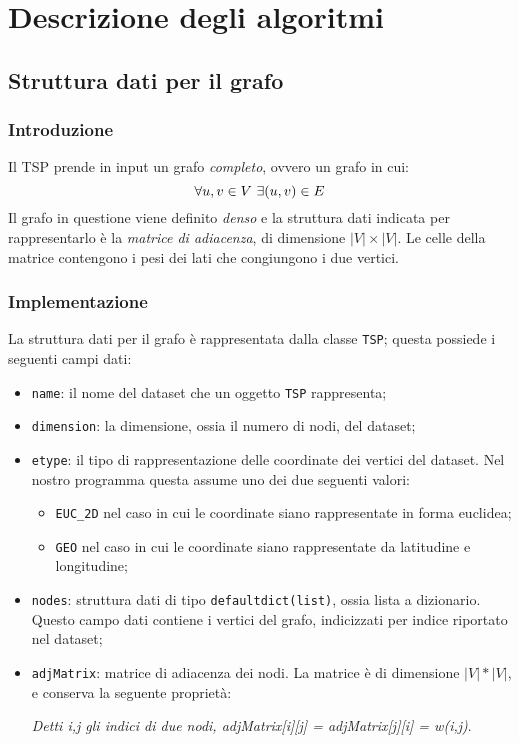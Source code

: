 \section{Descrizione degli algoritmi}

\subsection{Struttura dati per il grafo}

\subsubsection{Introduzione}

Il TSP prende in input un grafo \textit{completo}, ovvero un grafo in cui:
\[
    \forall u, v \in V \textnormal{ } \exists (u, v) \in E
\]
Il grafo in questione viene definito \textit{denso} e la struttura dati indicata per rappresentarlo è
la \textit{matrice di adiacenza}, di dimensione $|V| \times |V|$. Le celle della matrice contengono
i pesi dei lati che congiungono i due vertici.

\subsubsection{Implementazione}

La struttura dati per il grafo è rappresentata dalla classe \texttt{TSP}; questa possiede i seguenti campi dati:
\begin{itemize}
    \item \texttt{name}: il nome del dataset che un oggetto \texttt{TSP} rappresenta;
    \item \texttt{dimension}: la dimensione, ossia il numero di nodi, del dataset;
    \item \texttt{etype}: il tipo di rappresentazione delle coordinate dei vertici del dataset. Nel nostro programma questa assume uno dei due seguenti valori: \begin{itemize}
        \item \texttt{EUC\_2D} nel caso in cui le coordinate siano rappresentate in forma euclidea;
        \item \texttt{GEO} nel caso in cui le coordinate siano rappresentate da latitudine e longitudine;
    \end{itemize}
    \item \texttt{nodes}: struttura dati di tipo \texttt{defaultdict(list)}, ossia lista a dizionario. Questo campo dati contiene i vertici del grafo, indicizzati per indice riportato nel dataset;
    \item \texttt{adjMatrix}: matrice di adiacenza dei nodi. La matrice è di dimensione $|V|*|V|$, e conserva la seguente proprietà: 
    \begin{center}
        \textit{Detti i,j gli indici di due nodi, adjMatrix[i][j] = adjMatrix[j][i] = w(i,j)}.
    \end{center}
\end{itemize}

